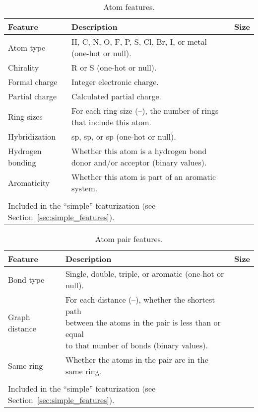 \begin{table*}[htbp]
    \caption{Atom features.}
    \label{table:atom_features}
    \centering
    \begin{tabular}{ l l r }
    \toprule
    Feature & Description & Size \\
    \midrule
    Atom type & H, C, N, O, F, P, S, Cl, Br, I, or metal (one-hot or null).
                  &  \\
    Chirality & R or S (one-hot or null). &  \\
    Formal charge & Integer electronic charge. &  \\
    Partial charge & Calculated partial charge. &  \\
    Ring sizes & For each ring size (--), the number of rings that include
                 this atom. &  \\
    Hybridization & sp, sp, or sp (one-hot or null). &  \\
    Hydrogen bonding & Whether this atom is a hydrogen bond donor and/or
                       acceptor (binary values). &  \\
    Aromaticity & Whether this atom is part of an aromatic system. &  \\
    \midrule
    \cellcolor{white} & \cellcolor{white} & \cellcolor{white} \\
    \bottomrule
    \multicolumn{3}{l}{\small * Included in the ``simple'' featurization (see
                       Section~\ref{sec:simple_features}).}
    \end{tabular}
\end{table*}

\begin{table*}[htbp]
    \caption{Atom pair features.}
    \label{table:pair_features}
    \centering
    \begin{tabular}{ l l r }
    \toprule
    Feature & Description & Size \\
    \midrule
    Bond type & Single, double, triple, or aromatic (one-hot or null).
                  &  \\
    Graph distance &
        \makecell[l]{For each distance (--), whether the shortest path \\
        between the atoms in the pair is less than or equal \\
        to that number of bonds (binary values).}
        &  \\
    Same ring & Whether the atoms in the pair are in the same ring. &  \\
    \midrule
     & &  \\
    \bottomrule
    \multicolumn{3}{l}{\cellcolor{white}\small * Included in the ``simple''
                       featurization (see Section~\ref{sec:simple_features}).}
    \end{tabular}
\end{table*}

